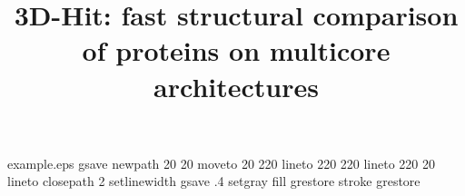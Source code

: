 %
%
%
%
%
\begin{filecontents*}{example.eps}
gsave
newpath
  20 20 moveto
  20 220 lineto
  220 220 lineto
  220 20 lineto
closepath
2 setlinewidth
gsave
  .4 setgray fill
grestore
stroke
grestore
\end{filecontents*}
%
\RequirePackage{fix-cm}
%
\documentclass[smallextended]{svjour3}       %
%
\smartqed  %
%
\usepackage{graphicx}
%
%
%
%
\usepackage[latin1]{inputenc}
\usepackage[T1]{fontenc}
\usepackage[bottom]{footmisc}
\usepackage{algorithmic}
\usepackage{algorithm}



\newcommand{\icm}{\emph{ICM}}
\newcommand{\ibm}{\emph{IBM}}
\newcommand{\prog}{\emph{3DHit}}






\title{3D-Hit: fast structural comparison of proteins on multicore architectures}
\label{DPlewczynski} %


